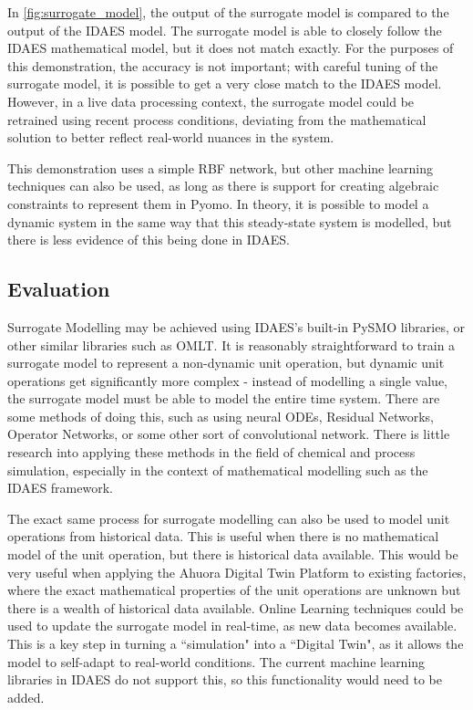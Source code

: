 \documentclass[12pt]{article}
\begin{document}
In \cref{fig:surrogate_model}, the output of the surrogate model is compared to the output of the IDAES model. The surrogate model is able to closely follow the IDAES mathematical model, but it does not match exactly. For the purposes of this demonstration, the accuracy is not important; with careful tuning of the surrogate model, it is possible to get a very close match to the IDAES model. However, in a live data processing context, the surrogate model could be retrained using recent process conditions, deviating from the mathematical solution to better reflect real-world nuances in the system. 

This demonstration uses a simple RBF network, but other machine learning techniques can also be used, as long as there is support for creating algebraic constraints to represent them in Pyomo. In theory, it is possible to model a dynamic system in the same way that this steady-state system is modelled, but there is less evidence of this being done in IDAES.

\subsection{Evaluation}



Surrogate Modelling may be achieved using IDAES's built-in PySMO libraries, or other similar libraries such as OMLT. 
It is reasonably straightforward to train a surrogate model to represent a non-dynamic unit operation, but dynamic unit operations get significantly more complex - instead of modelling a single value, the surrogate model must be able to model the entire time system. There are some methods of doing this, such as using neural ODEs, Residual Networks, Operator Networks, or some other sort of convolutional network. 
There is little research into applying these methods in the field of chemical and process simulation, especially in the context of mathematical modelling such as the IDAES framework.

The exact same process for surrogate modelling can also be used to model unit operations from historical data. 
This is useful when there is no mathematical model of the unit operation, but there is historical data available. 
This would be very useful when applying the Ahuora Digital Twin Platform to existing factories, where the exact mathematical properties of the unit operations are unknown but there is a wealth of historical data available. 
Online Learning techniques could be used to update the surrogate model in real-time, as new data becomes available. This is a key step in turning a ``simulation" into a ``Digital Twin", as it allows the model to self-adapt to real-world conditions. The current machine learning libraries in IDAES do not support this, so this functionality would need to be added.
\end{document}
